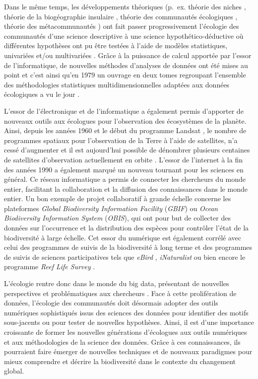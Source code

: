 \begin{refsection}
Dans le même temps, les développements théoriques (p.~ex. théorie des
niches \autocite{Hutchinson_1957}, théorie de la biogéographie insulaire
\autocite{MacArthur_1967}, théorie des communautés écologiques
\autocite{Vellend_2017}, théorie des métacommunautés
\autocite{Leibold_2018}) ont fait passer progressivement l'écologie des
communautés d'une science descriptive à une science
hypothético-déductive où différentes hypothèses ont pu être testées à
l'aide de modèles statistiques, univariées et/ou multivariées
\autocite{Legendre_2012}. Grâce à la puissance de calcul apportée par
l'essor de l'informatique, de nouvelles méthodes d'analyses de données
ont été mises au point et c'est ainsi qu'en 1979 un ouvrage en deux
tomes regroupant l'ensemble des méthodologies statistiques
multidimensionnelles adaptées aux données écologiques a vu le jour
\autocites[ ]{Legendre_1979a}{Legendre_1979b}.

L'essor de l'électronique et de l'informatique a également permis
d'apporter de nouveaux outils aux écologues pour l'observation des
écosystèmes de la planète. Ainsi, depuis les années 1960 et le début du
programme Landsat \autocite{Wulder_2019}, le nombre de programmes
spatiaux pour l'observation de la Terre à l'aide de satellites, n'a
cessé d'augmenter et il est aujourd'hui possible de dénombrer plusieurs
centaines de satellites d'observation actuellement en orbite \autocites[
]{Tatem_2008}{Anderson_2018}. L'essor de l'internet à la fin des années
1990 a également marqué un nouveau tournant pour les sciences en
général. Ce réseau informatique a permis de connecter les chercheurs du
monde entier, facilitant la collaboration et la diffusion des
connaissances dans le monde entier. Un bon exemple de projet
collaboratif à grande échelle concerne les plateformes \emph{Global
Biodiversity Information Facility} (\emph{GBIF}) ou \emph{Ocean
Biodiversity Information System} (\emph{OBIS}), qui ont pour but de
collecter des données sur l'occurrence et la distribution des espèces
pour contrôler l'état de la biodiversité à large échelle. Cet essor du
numérique est également corrélé avec celui des programmes de suivis de
la biodiversité à long terme \autocite{Buckley_2021b} et des programmes
de suivis de sciences participatives tels que \emph{eBird}
\autocite{Wood_2011b}, \emph{iNaturalist} \autocite{Unger_2021} ou bien
encore le programme \emph{Reef Life Survey} \autocite{Edgar_2014b}.

L'écologie rentre donc dans le monde du big data, présentant de
nouvelles perspectives et problématiques aux chercheurs
\autocite{Farley_2018}. Face à cette prolifération de données,
l'écologie des communautés doit désormais adopter des outils numériques
sophistiqués issus des sciences des données pour identifier des motifs
sous-jacents ou pour tester de nouvelles hypothèses. Ainsi, il est d'une
importance croissante de former les nouvelles générations d'écologues
aux outils numériques et aux méthodologies de la science des données.
Grâce à ces connaissances, ils pourraient faire émerger de nouvelles
techniques et de nouveaux paradigmes pour mieux comprendre et décrire la
biodiversité dans le contexte du changement global.


\end{refsection}
